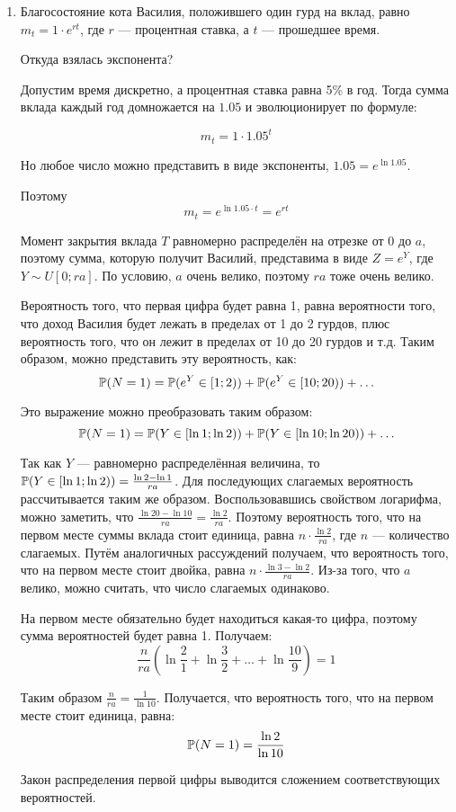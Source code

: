 \begin{enumerate}
\item Благосостояние кота Василия, положившего один гурд на вклад,
равно $m_t = 1\cdot e^{rt}$, где $r$ — процентная ставка, а $t$ — прошедшее время.

Откуда взялась экспонента?

Допустим время дискретно, а процентная ставка равна 5\% в год. 
Тогда сумма вклада каждый год домножается на $1.05$ и эволюционирует по формуле:

\[
m_t = 1 \cdot 1.05^t
\]

Но любое число можно представить в виде экспоненты, $1.05 = e^{\ln 1.05}$.

Поэтому
\[
m_t = e^{\ln 1.05 \cdot t}  = e^{rt}
\]


Момент закрытия вклада $T$ равномерно распределён на отрезке от 0 до $a$,
поэтому сумма, которую получит Василий, представима в виде $Z = e^{Y}$, где $Y \sim U[0; ra]$.
По условию, $a$ очень велико, поэтому $ra$ тоже очень велико.

Вероятность того, что первая цифра будет равна 1, равна вероятности того,
что доход Василия будет лежать в пределах от 1 до 2 гурдов, плюс вероятность того,
что он лежит в пределах от 10 до 20 гурдов и т.д.
Таким образом, можно представить эту вероятность, как:
\[
\P(N=1) = \P(e^Y \in [1;2) ) + \P(e^Y \in [10; 20) ) + \ldots
\]

Это выражение можно преобразовать таким образом:
\[
\P(N=1) = \P(Y \in [\ln 1; \ln2) ) + \P(Y \in [\ln 10; \ln 20) ) + \ldots
\]

Так как $Y$ — равномерно распределённая величина,
то $\P(Y \in [\ln 1; \ln2) ) = \frac{\ln 2 - \ln 1}{ra}$.
Для последующих слагаемых вероятность рассчитывается таким же образом.
Воспользовавшись свойством логарифма, можно заметить,
что $\frac{\ln 20 - \ln 10}{ra} = \frac{\ln 2}{ra}$.
Поэтому вероятность того, что на первом месте суммы вклада стоит единица,
равна $n\cdot \frac{\ln 2}{ra}$, где $n$ — количество слагаемых.
Путём аналогичных рассуждений получаем, что вероятность того,
что на первом месте стоит двойка, равна $n\cdot \frac{\ln 3- \ln 2}{ra}$.
Из-за того, что $a$ велико, можно считать, что число слагаемых одинаково.

На первом месте обязательно будет находиться какая-то цифра,
поэтому сумма вероятностей будет равна 1. Получаем:
\[
\frac{n}{ra}\left(\ln \frac{2}{1} + \ln \frac{3}{2} + \ldots + \ln \frac{10}{9}\right) = 1
\]

Таким образом $\frac{n}{ra} = \frac{1}{\ln 10}$.
Получается, что вероятность того, что на первом месте стоит единица, равна:
\[
\P (N=1) = \frac{\ln 2}{\ln 10}
\]

Закон распределения первой цифры выводится сложением соответствующих вероятностей.
\end{enumerate}


